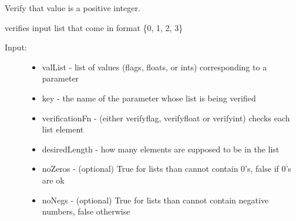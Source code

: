 \documentclass[letterpaper,10pt,english]{sphinxmanual}
\begin{document}
\begin{fulllineitems}
\begin{fulllineitems}
\end{fulllineitems}


\begin{fulllineitems}
\label{\detokenize{pydfnworks:pydfnworks.dfnGen.gen_input.input_helper.verify_int}}
Verify that value is a positive integer.

\end{fulllineitems}


\begin{fulllineitems}
\label{\detokenize{pydfnworks:pydfnworks.dfnGen.gen_input.input_helper.verify_list}}
verifies input list that come in format \{0, 1, 2, 3\}
\begin{description}
\item[{Input:}] \leavevmode\begin{itemize}
\item {} 
valList - list of values (flags, floats, or ints) corresponding to a parameter

\item {} 
key - the name of the parameter whose list is being verified

\item {} 
verificationFn - (either verifyflag, verifyfloat or verifyint) checks each list element

\item {} 
desiredLength - how many elements are supposed to be in the list

\item {} 
noZeros - (optional) True for lists than cannot contain 0’s, false if 0’s are ok

\item {} 
noNegs - (optional) True for lists than cannot contain negative numbers, false otherwise

\end{itemize}


\end{description}
\end{fulllineitems}
\end{fulllineitems}
\end{document}
